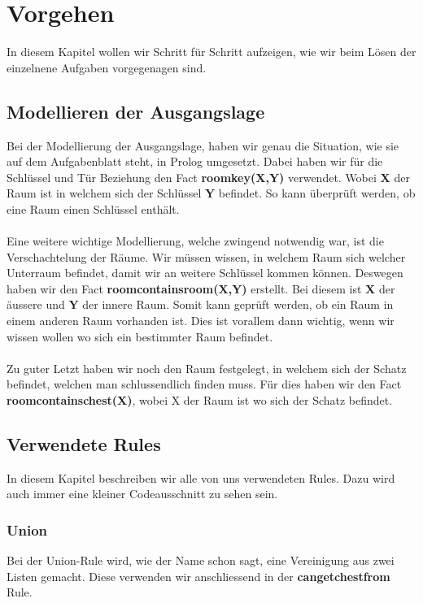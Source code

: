 \chapter{Vorgehen}
In diesem Kapitel wollen wir Schritt für Schritt
aufzeigen, wie wir beim Lösen der einzelnene
Aufgaben vorgegenagen sind.

\section{Modellieren der Ausgangslage}
Bei der Modellierung der Ausgangslage, haben wir genau
die Situation, wie sie auf dem Aufgabenblatt steht,
in Prolog umgesetzt. Dabei haben wir für die 
Schlüssel und Tür Beziehung den Fact
\textbf{roomkey(X,Y)} verwendet. Wobei \textbf{X} der Raum ist in welchem sich
der Schlüssel \textbf{Y} befindet. So kann überprüft 
werden, ob eine Raum einen Schlüssel enthält.\\
\\

\noindent
Eine weitere wichtige Modellierung, welche zwingend notwendig
war, ist die Verschachtelung der Räume. Wir müssen wissen,
in welchem Raum sich welcher Unterraum befindet, damit wir an 
weitere Schlüssel kommen können. Deswegen haben wir den
Fact \textbf{roomcontainsroom(X,Y)} erstellt. Bei diesem ist \textbf{X} der äussere und \textbf{Y}
der innere Raum. Somit kann geprüft werden, ob ein Raum in einem 
anderen Raum vorhanden ist. Dies ist vorallem dann wichtig, wenn
wir wissen wollen wo sich ein bestimmter Raum befindet.\\
\\

\noindent
Zu guter Letzt haben wir noch den Raum festgelegt, in welchem sich 
der Schatz befindet, welchen man schlussendlich finden muss. Für dies
haben wir den Fact \textbf{roomcontainschest(X)}, wobei X der Raum ist
wo sich der Schatz befindet.

\section{Verwendete Rules}
In diesem Kapitel beschreiben wir alle von uns verwendeten Rules.
Dazu wird auch immer eine kleiner Codeausschnitt zu sehen sein.

\subsection{Union}
Bei der Union-Rule wird, wie der Name schon sagt, eine Vereinigung
aus zwei Listen gemacht. Diese verwenden wir anschliessend in der 
\textbf{cangetchestfrom} Rule.

